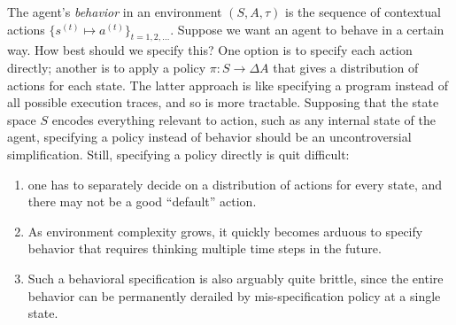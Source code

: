 \documentclass{article}
\begin{document}
    The agent's \emph{behavior} in an environment $(S, A, \tau)$ is the sequence of contextual actions
    $\{ s^{(t)} \mapsto a^{(t)} \}_{t=1,2,\ldots}$.
    Suppose we want an agent to behave in a certain way. How best should we specify this?
    One option is to specify each action directly; another is to apply a policy $\pi: S \to \Delta A$ that gives a distribution of actions for each state.
    The latter approach is like specifying a program instead of all possible execution traces, and so is more tractable.
    Supposing that the state space $S$ encodes everything relevant to action, such as any internal state of the agent, specifying a policy instead of behavior should be an uncontroversial simplification.
    Still, specifying a policy directly is quit difficult:

    \begin{enumerate}
        \item one has to separately decide on a distribution of actions for every state, and there may not be a good ``default'' action.
        \item  As environment complexity grows, it quickly becomes arduous to specify behavior that requires thinking multiple time steps in the future.
        \item Such a behavioral specification is also arguably quite brittle, since the entire behavior can be permanently derailed by mis-specification policy at a single state.
    \end{enumerate}
\end{document}
